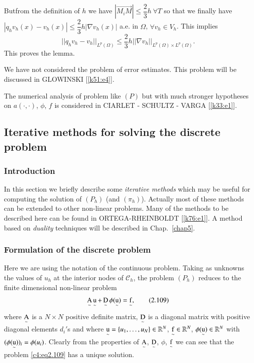 But\pageoriginale  from the definition of $h$ we have $|\overrightarrow{M_i M}|\leq \dfrac{2}{3}h \ \forall T$ so that we finally have $|q_h v_h (x) - v_h(x)| \leq \dfrac{2}{3} h |\nabla v_h(x)|$ a.e. in $\Omega$, $\forall v_h \in V_h$. This implies 
$$
||q_h v_h - v_h ||_{L^p(\Omega)} \leq \frac{2}{3} h ||\nabla v_h||_{L^p(\Omega) \times L^p(\Omega)}.
$$
This proves the lemma.

\begin{remark}\label{c4:rem2.4}%
We have not considered the problem of error estimates. This problem
will be discussed in GLOWINSKI [\ref{k51:e4}]. 
\end{remark}

\begin{remark}\label{c4:rem2.5}%
The numerical analysis of problem like $(P)$ but with much stronger
hypotheses on $a(\cdot, \cdot)$, $\phi$, $f$ is considered in CIARLET
- SCHULTZ - VARGA [\ref{k33:e1}]. 
\end{remark}

\subsection{Iterative methods for solving the discrete problem}\label{c4:ss2.6}

\subsubsection{Introduction}\label{c4:sss2.6.1} 

In this section we briefly describe some \textit{iterative methods} 
which may be useful for computing the solution of $(P_h)$ (and 
$(\pi_h)$). Actually most of these methods can be extended to other 
non-linear problems. Many of the methods to be described here can be 
found in ORTEGA-\break RHEINBOLDT [\ref{k76:e1}]. A method based on \textit{duality} 
techniques will be described in Chap.~\ref{chap5}.

\subsubsection{Formulation of the discrete problem}\label{c4:sss2.6.2}

Here we are using the notation of the continuous problem. Taking as
unknowns the values of $u_h$ at the interior nodes of $\mathscr{C}_h$,
the problem $(P_h)$ reduces to the finite dimensional non-linear
problem  
\begin{equation}
\operatorname*{A}\limits_\sim \operatorname*{u}\limits_\sim + \operatorname*{D}\limits_\sim \phi (\operatorname*{u}\limits_\sim) = 
\operatorname*{f}\limits_\sim,\tag{2.109}\label{c4:eq2.109}
\end{equation}
where $\operatorname*{A}\limits_\sim$ is a $N \times N$ positive definite matrix, $\operatorname*{D}\limits_\sim$ is a diagonal matrix with positive diagonal elements $d_i'$s and where $\operatorname*{u}\limits_\sim = \{u_1, \ldots, u_N\} \in \mathbb{R}^N$, $\operatorname*{f}\limits_\sim \in \mathbb{R}^N$, $\phi (\operatorname*{u}\limits_\sim) \in \mathbb{R}^N$ with $(\phi(\operatorname*{u}\limits_\sim))_i = \phi (u_i)$. Clearly from the properties of $\operatorname*{A}\limits_\sim$, $\operatorname*{D}\limits_\sim$, $\phi$, $\operatorname*{f}\limits_\sim$ we can see that the problem \eqref{c4:eq2.109} has a unique solution. 

